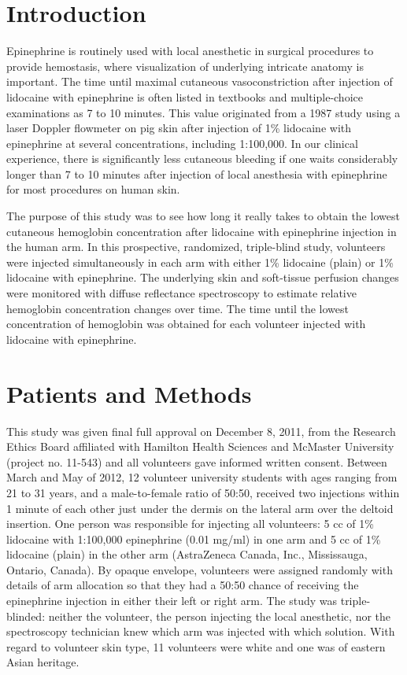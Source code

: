 \section{Introduction}
Epinephrine is routinely used with local anesthetic in surgical procedures to provide hemostasis, where visualization of underlying intricate anatomy is important. The time until maximal cutaneous vasoconstriction after injection of lidocaine with epinephrine is often listed in textbooks\cite{Knize2007,Kryger2007} and multiple-choice examinations as 7 to 10 minutes. This value originated from a 1987 study using a laser Doppler flowmeter on pig skin after injection of 1\% lidocaine with epinephrine at several concentrations, including 1:100,000.\cite{Larrabee1987} In our clinical experience, there is significantly less cutaneous bleeding if one waits considerably longer than 7 to 10 minutes after injection of local anesthesia with epinephrine for most procedures on human skin.

The purpose of this study was to see how long it really takes to obtain the lowest cutaneous hemoglobin concentration after lidocaine with epinephrine injection in the human arm. In this prospective, randomized, triple-blind study, volunteers were injected simultaneously in each arm with either 1\% lidocaine (plain) or 1\% lidocaine with epinephrine. The underlying skin and soft-tissue perfusion changes were monitored with diffuse reflectance spectroscopy to estimate relative hemoglobin concentration changes over time. The time until the lowest concentration of hemoglobin was obtained for each volunteer injected with lidocaine with epinephrine.

\section{Patients and Methods}
This study was given final full approval on December 8, 2011, from the Research Ethics Board affiliated with Hamilton Health Sciences and McMaster University (project no. 11-543) and all volunteers gave informed written consent. Between March and May of 2012, 12 volunteer university students with ages ranging from 21 to 31 years, and a male-to-female ratio of 50:50, received two injections within 1 minute of each other just under the dermis on the lateral arm over the deltoid insertion. One person was responsible for injecting all volunteers: 5 cc of 1\% lidocaine with 1:100,000 epinephrine (0.01 mg/ml) in one arm and 5 cc of 1\% lidocaine (plain) in the other arm (AstraZeneca Canada, Inc., Mississauga, Ontario, Canada). By opaque envelope, volunteers were assigned randomly with details of arm allocation so that they had a 50:50 chance of receiving the epinephrine injection in either their left or right arm. The study was triple-blinded: neither the volunteer, the person injecting the local anesthetic, nor the spectroscopy technician knew which arm was injected with which solution. With regard to volunteer skin type, 11 volunteers were white and one was of eastern Asian heritage.

